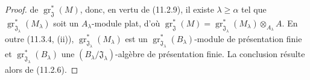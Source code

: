 \begin{proof}
de $\operatorname{gr}_{\mathfrak J}^*(M)$, donc, en vertu de (11.2.9), il
existe $\lambda\geq\alpha$ tel que
$\operatorname{gr}_{\mathfrak J_\lambda}^*(M_\lambda)$ soit un
$A_\lambda$-module plat, d'où
$\operatorname{gr}_{\mathfrak J}^*(M)
=\operatorname{gr}_{\mathfrak J_\lambda}^*(M_\lambda)\otimes_{A_\lambda}A$.
En outre (11.3.4, (ii)),
$\operatorname{gr}_{\mathfrak J_\lambda}^*(M_\lambda)$ est un
$\operatorname{gr}_{\mathfrak J_\lambda}^*(B_\lambda)$-module de présentation
finie et $\operatorname{gr}_{\mathfrak J_\lambda}^*(B_\lambda)$ une
$(B_\lambda/\mathfrak J_\lambda)$-algèbre de présentation finie. La conclusion
résulte alors de (11.2.6).
\end{proof}

